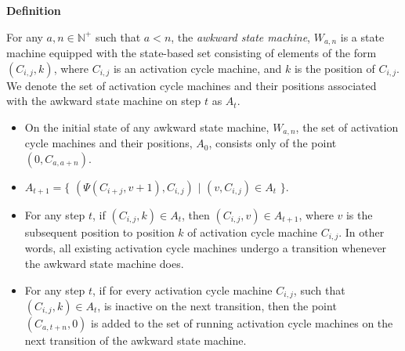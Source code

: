 \documentclass[a4paper,12pt]{article}
\begin{document}
\label{definition:awkward_state_machine}
\hypertarget{definition:awkward_state_machine}{}
\begin{tcolorbox}
\textbf{Definition}

\noindent For any $a, n \in \mathbb{N^+}$ such that $a < n$, the \textit{awkward state machine}, $W_{a, n}$ is a state machine equipped with the state-based set consisting of elements of the form $(C_{i,j}, k)$, where $C_{i, j}$ is an activation cycle machine, and $k$ is the position of $C_{i, j}$.\\

\noindent We denote the set of activation cycle machines and their positions associated with the awkward state machine on step $t$ as $A_t$.

\begin{itemize}

\item On the initial state of any awkward state machine, $W_{a, n}$, the set of activation cycle machines and their positions, $A_0$, consists only of the point $(0, C_{a, a + n})$.

\item $A_{t + 1} = \{$ $(\Psi(C_{i + j}, v + 1), C_{i, j})$ $|$ $(v, C_{i, j}) \in A_t$ $\}$.

\item For any step $t$, if $(C_{i,j}, k) \in A_t$, then $(C_{i, j}, v) \in A_{t+1}$, where $v$ is the subsequent position to position $k$ of activation cycle machine $C_{i, j}$. In other words, all existing activation cycle machines undergo a transition whenever the awkward state machine does.

\item For any step $t$, if for every activation cycle machine $C_{i,j}$, such that $(C_{i,j}, k) \in A_t$, is inactive on the next transition, then the point $(C_{a, t + n}, 0)$ is added to the set of running activation cycle machines on the next transition of the awkward state machine.

\end{itemize}
\end{tcolorbox}
\end{document}
